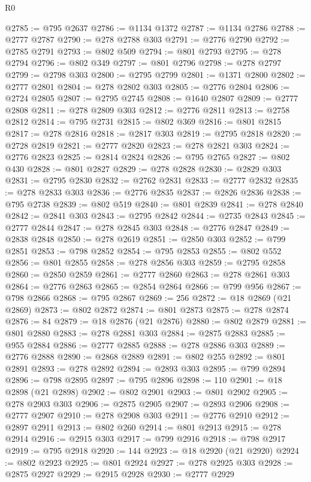 \begin{lexlean}{R0}
\begin{coremodule}
@2785 := @795 @2637
@2786 := @1134 @1372
@2787 := @1134 @2786
@2788 := @2777 @2787
@2790 := @278 @2788 @303
@2791 := @2776 @2790
@2792 := @2785 @2791
@2793 := @802 @509
@2794 := @801 @2793
@2795 := @278 @2794
@2796 := @802 @349
@2797 := @801 @2796
@2798 := @278 @2797
@2799 := @2798 @303
@2800 := @2795 @2799
@2801 := @1371 @2800
@2802 := @2777 @2801
@2804 := @278 @2802 @303
@2805 := @2776 @2804
@2806 := @2724 @2805
@2807 := @2795 @2745
@2808 := @1640 @2807
@2809 := @2777 @2808
@2811 := @278 @2809 @303
@2812 := @2776 @2811
@2813 := @2758 @2812
@2814 := @795 @2731
@2815 := @802 @369
@2816 := @801 @2815
@2817 := @278 @2816
@2818 := @2817 @303
@2819 := @2795 @2818
@2820 := @2728 @2819
@2821 := @2777 @2820
@2823 := @278 @2821 @303
@2824 := @2776 @2823
@2825 := @2814 @2824
@2826 := @795 @2765
@2827 := @802 @430
@2828 := @801 @2827
@2829 := @278 @2828
@2830 := @2829 @303
@2831 := @2795 @2830
@2832 := @2762 @2831
@2833 := @2777 @2832
@2835 := @278 @2833 @303
@2836 := @2776 @2835
@2837 := @2826 @2836
@2838 := @795 @2738
@2839 := @802 @519
@2840 := @801 @2839
@2841 := @278 @2840
@2842 := @2841 @303
@2843 := @2795 @2842
@2844 := @2735 @2843
@2845 := @2777 @2844
@2847 := @278 @2845 @303
@2848 := @2776 @2847
@2849 := @2838 @2848
@2850 := @278 @2619
@2851 := @2850 @303
@2852 := @799 @2851
@2853 := @798 @2852
@2854 := @795 @2853
@2855 := @802 @552
@2856 := @801 @2855
@2858 := @278 @2856 @303
@2859 := @2795 @2858
@2860 := @2850 @2859
@2861 := @2777 @2860
@2863 := @278 @2861 @303
@2864 := @2776 @2863
@2865 := @2854 @2864
@2866 := @799 @956
@2867 := @798 @2866
@2868 := @795 @2867
@2869 := 256
@2872 := @18 @2869 (@21 @2869)
@2873 := @802 @2872
@2874 := @801 @2873
@2875 := @278 @2874
@2876 := 84
@2879 := @18 @2876 (@21 @2876)
@2880 := @802 @2879
@2881 := @801 @2880
@2883 := @278 @2881 @303
@2884 := @2875 @2883
@2885 := @955 @2884
@2886 := @2777 @2885
@2888 := @278 @2886 @303
@2889 := @2776 @2888
@2890 := @2868 @2889
@2891 := @802 @255
@2892 := @801 @2891
@2893 := @278 @2892
@2894 := @2893 @303
@2895 := @799 @2894
@2896 := @798 @2895
@2897 := @795 @2896
@2898 := 110
@2901 := @18 @2898 (@21 @2898)
@2902 := @802 @2901
@2903 := @801 @2902
@2905 := @278 @2903 @303
@2906 := @2875 @2905
@2907 := @2893 @2906
@2908 := @2777 @2907
@2910 := @278 @2908 @303
@2911 := @2776 @2910
@2912 := @2897 @2911
@2913 := @802 @260
@2914 := @801 @2913
@2915 := @278 @2914
@2916 := @2915 @303
@2917 := @799 @2916
@2918 := @798 @2917
@2919 := @795 @2918
@2920 := 144
@2923 := @18 @2920 (@21 @2920)
@2924 := @802 @2923
@2925 := @801 @2924
@2927 := @278 @2925 @303
@2928 := @2875 @2927
@2929 := @2915 @2928
@2930 := @2777 @2929

\end{coremodule}
\end{lexlean}
